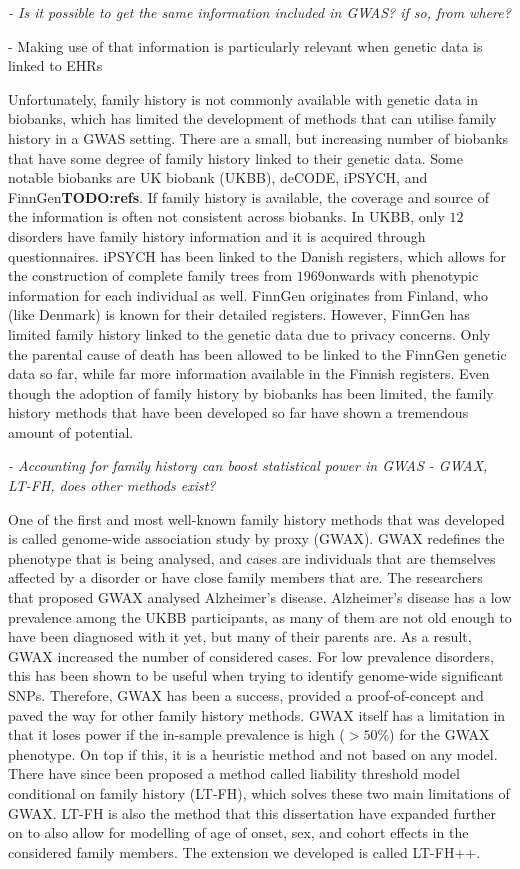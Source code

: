 {\itshape
- Is it possible to get the same information included in GWAS? if so, from where?

	- Making use of that information is particularly relevant when genetic data is linked to EHRs
}

Unfortunately, family history is not commonly available with genetic data in biobanks, which has limited the development of methods that can utilise family history in a GWAS setting. There are a small, but increasing number of biobanks that have some degree of family history linked to their genetic data. Some notable biobanks are UK biobank (UKBB), deCODE, iPSYCH, and FinnGen\textbf{TODO:refs}. If family history is available, the coverage and source of the information is often not consistent across biobanks. In UKBB, only $ 12 $ disorders have family history information and it is acquired through questionnaires. iPSYCH has been linked to the Danish registers, which allows for the construction of complete family trees from $ 1969 $onwards with phenotypic information for each individual as well. FinnGen originates from Finland, who (like Denmark) is known for their detailed registers. However, FinnGen has limited family history linked to the genetic data due to privacy concerns. Only the parental cause of death has been allowed to be linked to the FinnGen genetic data so far, while far more information available in the Finnish registers. Even though the adoption of family history by biobanks has been limited, the family history methods that have been developed so far have shown a tremendous amount of potential. 

{\itshape
	- Accounting for family history can boost statistical power in GWAS
	- GWAX, LT-FH, does other methods exist?
}

One of the first and most well-known family history methods that was developed is called genome-wide association study by proxy (GWAX). GWAX redefines the phenotype that is being analysed, and cases are individuals that are themselves affected by a disorder or have close family members that are. The researchers that proposed GWAX analysed Alzheimer's disease. Alzheimer's disease has a low prevalence among the UKBB participants, as many of them are not old enough to have been diagnosed with it yet, but many of their parents are. As a result, GWAX increased the number of considered cases. For low prevalence disorders, this has been shown to be useful when trying to identify genome-wide significant SNPs. Therefore, GWAX has been a success, provided a proof-of-concept and paved the way for other family history methods. GWAX itself has a limitation in that it loses power if the in-sample prevalence is high ($ >50\% $) for the GWAX phenotype. On top if this, it is a heuristic method and not based on any model. There have since been proposed a method called liability threshold model conditional on family history (LT-FH), which solves these two main limitations of GWAX. LT-FH is also the method that this dissertation have expanded further on to also allow for modelling of age of onset, sex, and cohort effects in the considered family members. The extension we developed is called LT-FH++.


